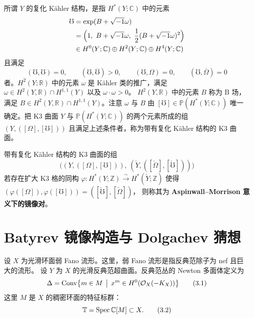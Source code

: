 
所谓 $Y$ 的复化 Kähler 结构，是指 $H^{*}(Y;\mathbb{C})$ 中的元素
\begin{align*}
  \mho&=\exp(B+\sqrt{-1}\omega)\\
  &=\Bigl(1,\ B+\sqrt{-1}\omega,\ \frac{1}{2}(B+\sqrt{-1}\omega)^{2}\Bigr)\\
  &\in H^{0}(Y;\mathbb{C})\oplus H^{2}(Y;\mathbb{C})\oplus H^{4}(Y;\mathbb{C})
\end{align*}
且满足
\begin{equation}
  (\mho,\mho)=0,\qquad(\mho,\overline{\mho})>0,\qquad
  (\mho,\Omega)=0,\qquad(\mho,\overline{\Omega})=0 \tag{2.2}
\end{equation}
者。$H^{2}(Y;\mathbb{R})$ 中的元素 $\omega$ 是 Kähler 类的推广，满足
$\omega\in H^{2}(Y,\mathbb{R})\cap H^{1,1}(Y)$ 以及 $\omega\cdot\omega>0$。
$H^{2}(Y,\mathbb{R})$ 中的元素 $B$ 称为 B 场，满足
$B\in H^{2}(Y,\mathbb{R})\cap H^{1,1}(Y)$。注意 $\omega$ 与 $B$ 由
$[\mho]\in\mathbb{P}(H^{*}(Y;\mathbb{C}))$ 唯一确定。把 K3 曲面 $Y$ 与
$\mathbb{P}(H^{*}(Y;\mathbb{C}))$ 的两个元素所成的组 $(Y,([\Omega],[\mho]))$
且满足上述条件者，称为带有复化 Kähler 结构的 K3 曲面。

\begin{definition}
带有复化 Kähler 结构的 K3 曲面的组
\[
  \bigl((Y,([\Omega],[\mho])),\ (\check{Y},([\check{\Omega}],[\check{\mho}]))\bigr)
\]
若存在扩大 K3 格的同构
$\varphi\colon H^{*}(Y;\mathbb{Z})\xrightarrow{\sim}H^{*}(\check{Y};\mathbb{Z})$ 使得
$(\varphi([\Omega]),\varphi([\mho]))=([\check{\mho}],[\check{\Omega}])$，
则称其为 \textbf{Aspinwall–Morrison 意义下的镜像对}。
\end{definition}

\section{Batyrev 镜像构造与 Dolgachev 猜想}

设 $X$ 为光滑环面弱 Fano 流形。这里，弱 Fano 流形是指反典范除子为 nef 且巨大的流形。
设 $Y$ 为 $X$ 的光滑反典范超曲面。反典范丛的 Newton 多面体定义为
\begin{equation}
  \Delta=\operatorname{Conv}\bigl\{m\in M\,\bigm|\,x^{m}\in H^{0}(\mathcal{O}_{X}(-K_{X}))\bigr\} \tag{3.1}
\end{equation}
这里 $M$ 是 $X$ 的稠密环面的特征标群：
\begin{equation}
  \mathbb{T}=\operatorname{Spec}\mathbb{C}[M]\subset X. \tag{3.2}
\end{equation}

